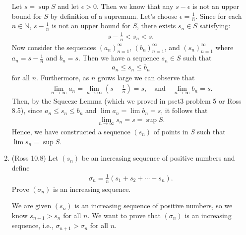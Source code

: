\documentclass [10pt]{article}
\newcommand{\jg}[1]{{\color{blue} #1}}
\begin{document}
\begin{enumerate}
{Let $s = \sup S$ and let $\epsilon > 0$. Then we know that any $s - \epsilon$ is not an upper bound for $S$ by definition of a supremum. Let's choose $\epsilon = \frac{1}{n}$. Since for each $n \in \mathbb{N}$, $s - \frac{1}{n}$ is not an upper bound for $S$, there exists $s_n \in S$ satisfying: 
\begin{align*}
    s - \frac{1}{n} < s_n < s. 
\end{align*}
Now consider the sequences $(a_n)_{n=1}^{\infty}$, $(b_n)_{n=1}^{\infty}$, and $(s_n)_{n=1}^{\infty}$ where $a_n = s-\frac{1}{n}$ and $b_n = s$. Then we have a sequence $s_n \in S$ such that 
\begin{align*}
    a_n \leq s_n \leq b_n
\end{align*}
for all $n$. Furthermore, as $n$ grows large we can observe that 
\begin{align*}
    \lim_{n\rightarrow \infty} a_n = \lim_{n\rightarrow \infty} \left(s - \frac{1}{n} \right) = s, \quad \text{and} \quad \lim_{n\rightarrow \infty} b_n = s. 
\end{align*}
Then, by the Squeeze Lemma (which we proved in pset3 problem 5 or Ross 8.5), since $a_n \leq s_n \leq b_n$ and $\lim a_n = \lim b_n = s$, it follows that 
\begin{align*}
    \lim_{n\rightarrow \infty} s_n = s = \sup S. 
\end{align*}
Hence, we have constructed a sequence $(s_n)$ of points in $S$ such that $\lim s_n = \sup S$. 
}
\clearpage

\item (Ross 10.8) Let $(s_n)$ be an increasing sequence of positive numbers and
define
\begin{align*}
\sigma_n = \frac{1}{n}(s_1 + s_2 + \cdots + s_n).
\end{align*}
Prove $(\sigma_n)$ is an increasing sequence.

\jg{
We are given $(s_n)$ is an increasing sequence of positive numbers, so we know $s_{n+1} > s_n$ for all $n$. We want to prove that $(\sigma_n)$ is an increasing sequence, i.e., $\sigma_{n+1} > \sigma_n$ for all $n$. 

}
\end{enumerate}
\end{document}
